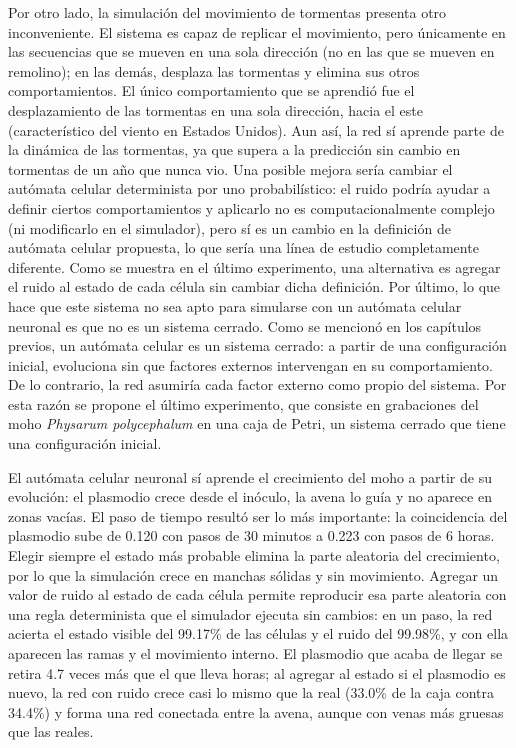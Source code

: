 Por otro lado, la simulación del movimiento de tormentas presenta otro inconveniente. El sistema es capaz de replicar el movimiento, pero únicamente en las secuencias que se mueven en una sola dirección (no en las que se mueven en remolino); en las demás, desplaza las tormentas y elimina sus otros comportamientos. El único comportamiento que se aprendió fue el desplazamiento de las tormentas en una sola dirección, hacia el este (característico del viento en Estados Unidos). Aun así, la red sí aprende parte de la dinámica de las tormentas, ya que supera a la predicción sin cambio en tormentas de un año que nunca vio. Una posible mejora sería cambiar el autómata celular determinista por uno probabilístico: el ruido podría ayudar a definir ciertos comportamientos y aplicarlo no es computacionalmente complejo (ni modificarlo en el simulador), pero sí es un cambio en la definición de autómata celular propuesta, lo que sería una línea de estudio completamente diferente. Como se muestra en el último experimento, una alternativa es agregar el ruido al estado de cada célula sin cambiar dicha definición. Por último, lo que hace que este sistema no sea apto para simularse con un autómata celular neuronal es que no es un sistema cerrado. Como se mencionó en los capítulos previos, un autómata celular es un sistema cerrado: a partir de una configuración inicial, evoluciona sin que factores externos intervengan en su comportamiento. De lo contrario, la red asumiría cada factor externo como propio del sistema. Por esta razón se propone el último experimento, que consiste en grabaciones del moho \textit{Physarum polycephalum} en una caja de Petri, un sistema cerrado que tiene una configuración inicial.

El autómata celular neuronal sí aprende el crecimiento del moho a partir de su evolución: el plasmodio crece desde el inóculo, la avena lo guía y no aparece en zonas vacías. El paso de tiempo resultó ser lo más importante: la coincidencia del plasmodio sube de 0.120 con pasos de 30 minutos a 0.223 con pasos de 6 horas. Elegir siempre el estado más probable elimina la parte aleatoria del crecimiento, por lo que la simulación crece en manchas sólidas y sin movimiento. Agregar un valor de ruido al estado de cada célula permite reproducir esa parte aleatoria con una regla determinista que el simulador ejecuta sin cambios: en un paso, la red acierta el estado visible del 99.17\% de las células y el ruido del 99.98\%, y con ella aparecen las ramas y el movimiento interno. El plasmodio que acaba de llegar se retira 4.7 veces más que el que lleva horas; al agregar al estado si el plasmodio es nuevo, la red con ruido crece casi lo mismo que la real (33.0\% de la caja contra 34.4\%) y forma una red conectada entre la avena, aunque con venas más gruesas que las reales.

